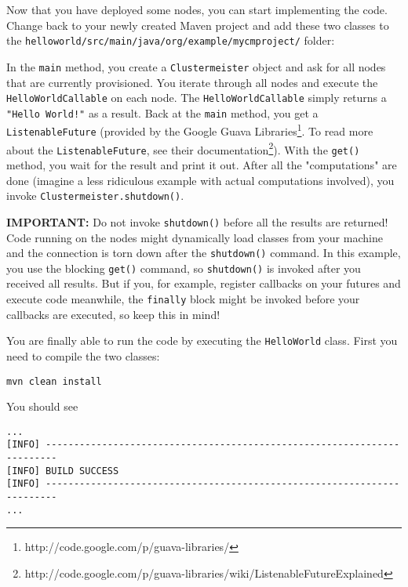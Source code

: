 \documentclass{article}
\begin{document}
Now that you have deployed some nodes, you can start implementing the code. Change back to your newly created Maven project and add these two classes to the \texttt{helloworld/src/main/java/org/example/mycmproject/} folder:





In the \texttt{main} method, you create a \texttt{Clustermeister} object and ask for all nodes that are currently provisioned. You iterate through all nodes and execute the \texttt{HelloWorldCallable} on each node. The \texttt{HelloWorldCallable} simply returns a \texttt{"Hello World!"} as a result. Back at the \texttt{main} method, you get a \texttt{ListenableFuture} (provided by the Google Guava Libraries\footnote{http://code.google.com/p/guava-libraries/}. To read more about the \texttt{ListenableFuture}, see their documentation\footnote{http://code.google.com/p/guava-libraries/wiki/ListenableFutureExplained}). With the \texttt{get()} method, you wait for the result and print it out. After all the "computations" are done (imagine a less ridiculous example with actual computations involved), you invoke \texttt{Clustermeister.shutdown()}.

\textbf{IMPORTANT:} Do not invoke \texttt{shutdown()} before all the results are returned! Code running on the nodes might dynamically load classes from your machine and the connection is torn down after the \texttt{shutdown()} command. In this example, you use the blocking \texttt{get()} command, so \texttt{shutdown()} is invoked after you received all results. But if you, for example, register callbacks on your futures and execute code meanwhile, the \texttt{finally} block might be invoked before your callbacks are executed, so keep this in mind!

You are finally able to run the code by executing the \texttt{HelloWorld} class. First you need to compile the two classes:

\begin{lstlisting}[breaklines=true, backgroundcolor=\color{lbcolor}]
mvn clean install
\end{lstlisting}

You should see

\begin{lstlisting}[breaklines=true, backgroundcolor=\color{lbcolor}]
...
[INFO] ------------------------------------------------------------------------
[INFO] BUILD SUCCESS
[INFO] ------------------------------------------------------------------------
...
\end{lstlisting}
\end{document}
